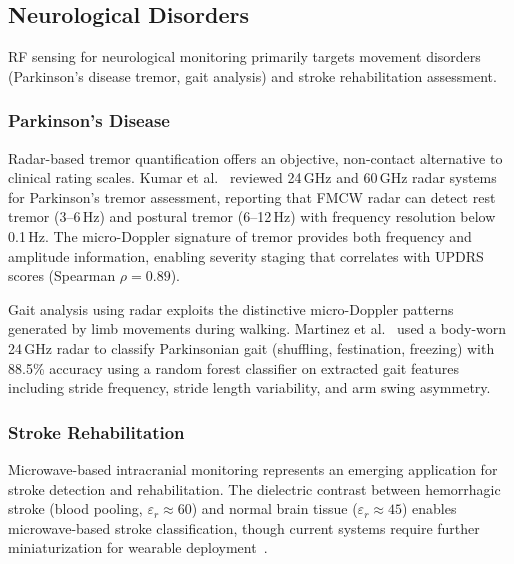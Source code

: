 \documentclass[journal,twoside]{IEEEtran}
\begin{document}
\subsection{Neurological Disorders}
\label{subsec:neuro}

RF sensing for neurological monitoring primarily targets movement disorders (Parkinson's disease tremor, gait analysis) and stroke rehabilitation assessment.

\subsubsection{Parkinson's Disease}
Radar-based tremor quantification offers an objective, non-contact alternative to clinical rating scales. Kumar et al.~\cite{ref_parkinson_review2025} reviewed 24\,GHz and 60\,GHz radar systems for Parkinson's tremor assessment, reporting that FMCW radar can detect rest tremor (3--6\,Hz) and postural tremor (6--12\,Hz) with frequency resolution below 0.1\,Hz. The micro-Doppler signature of tremor provides both frequency and amplitude information, enabling severity staging that correlates with UPDRS scores (Spearman $\rho = 0.89$).

Gait analysis using radar exploits the distinctive micro-Doppler patterns generated by limb movements during walking. Martinez et al.~\cite{ref_parkinson_wearable2023} used a body-worn 24\,GHz radar to classify Parkinsonian gait (shuffling, festination, freezing) with 88.5\% accuracy using a random forest classifier on extracted gait features including stride frequency, stride length variability, and arm swing asymmetry.

\subsubsection{Stroke Rehabilitation}
Microwave-based intracranial monitoring represents an emerging application for stroke detection and rehabilitation. The dielectric contrast between hemorrhagic stroke (blood pooling, $\varepsilon_r \approx 60$) and normal brain tissue ($\varepsilon_r \approx 45$) enables microwave-based stroke classification, though current systems require further miniaturization for wearable deployment~\cite{ref_neuro_mw2024}.
\end{document}
